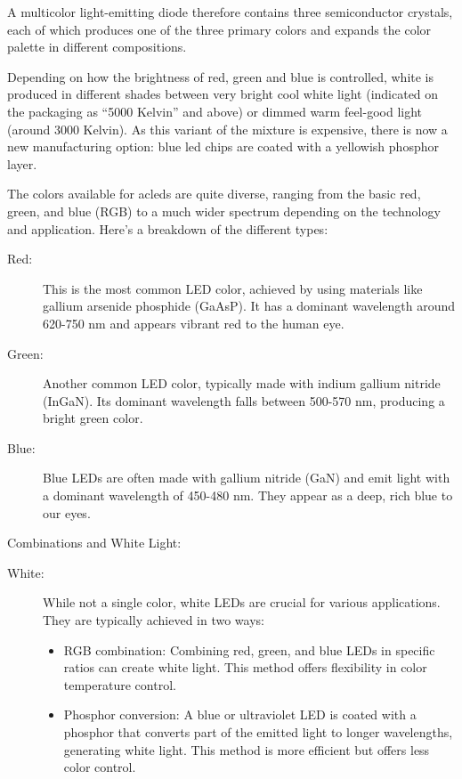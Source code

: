 A multicolor light-emitting diode therefore contains three semiconductor crystals, each of which produces one of the three primary colors and expands the color palette in different compositions.

Depending on how the brightness of red, green and blue is controlled, white is produced in different shades between very bright cool white light (indicated on the packaging as ``5000 Kelvin'' and above) or dimmed warm feel-good light (around 3000 Kelvin). As this variant of the mixture is expensive, there is now a new manufacturing option: blue \ac{led} chips are coated with a yellowish phosphor layer.

The colors available for ac{led}s are quite diverse, ranging from the basic red, green, and blue (RGB) to a much wider spectrum depending on the technology and application. \cite{Quadrios:2020} Here's a breakdown of the different types:

\begin{description}
  \item[Red:] This is the most common LED color, achieved by using materials like gallium arsenide phosphide (GaAsP). It has a dominant wavelength around 620-750 nm and appears vibrant red to the human eye.
  \item [Green:] Another common LED color, typically made with indium gallium nitride (InGaN). Its dominant wavelength falls between 500-570 nm, producing a bright green color.
  \item [Blue:] Blue LEDs are often made with gallium nitride (GaN) and emit light with a dominant wavelength of 450-480 nm. They appear as a deep, rich blue to our eyes.
\end{description}  

\medskip
  
Combinations and White Light:

\begin{description}
   \item [White:] While not a single color, white LEDs are crucial for various applications. They are typically achieved in two ways:
     \begin{itemize}
       \item RGB combination: Combining red, green, and blue LEDs in specific ratios can create white light. This method offers flexibility in color temperature control.
       \item Phosphor conversion: A blue or ultraviolet LED is coated with a phosphor that converts part of the emitted light to longer wavelengths, generating white light. This method is more efficient but offers less color control.
     \end{itemize}
\end{description}

